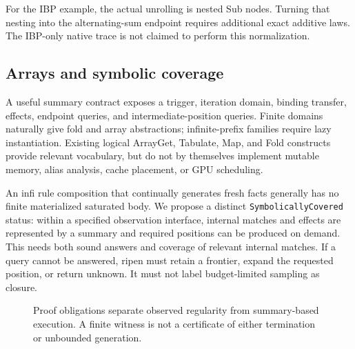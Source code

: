 \documentclass[11pt,a4paper]{article}
\newcommand{\code}[1]{\texttt{#1}}
\begin{document}
\MathSummary
For the IBP example, the actual unrolling is nested Sub nodes. Turning that
nesting into the alternating-sum endpoint requires additional exact additive
laws. The IBP-only native trace is not claimed to perform this normalization.

\subsection{Arrays and symbolic coverage}
A useful summary contract exposes a trigger, iteration domain, binding transfer,
effects, endpoint queries, and intermediate-position queries. Finite domains
naturally give fold and array abstractions; infinite-prefix families require
lazy instantiation. Existing logical ArrayGet, Tabulate, Map, and Fold constructs
provide relevant vocabulary, but do not by themselves implement mutable memory,
alias analysis, cache placement, or GPU scheduling.

An infi rule composition that continually generates fresh facts generally has no finite
materialized saturated body. We propose a distinct \code{SymbolicallyCovered} status:
within a specified observation interface, internal matches and effects are
represented by a summary and required positions can be produced on demand.
This needs both sound answers and coverage of relevant internal matches. If a
query cannot be answered, ripen must retain a frontier, expand the requested
position, or return unknown. It must not label budget-limited sampling as closure.

\begin{figure}[t]
\centering
{}
\caption{Proof obligations separate observed regularity from summary-based
execution. A finite witness is not a certificate of either termination or
unbounded generation.}
\end{figure}
\end{document}
